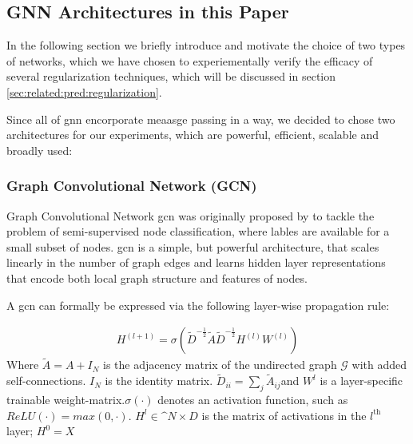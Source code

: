 \subsection{GNN Architectures in this Paper}
\label{sec:related:architectures}


In the following section we briefly introduce and
motivate the choice of two types of networks, which we have
chosen to experiementally verify the efficacy of several regularization techniques, which will be
discussed in section \cref{sec:related:pred:regularization}.

Since all of \ac{gnn} encorporate meaasge passing in a way, we decided to chose two architectures for our experiments, which are powerful, efficient, scalable and broadly used:
\subsubsection{Graph Convolutional Network (GCN)}
\label{sec:related:architectures:gcn}
Graph Convolutional Network \ac{gcn} was originally proposed by \citet{Kipf2017} to tackle the problem of semi-supervised node classification, where lables are available for a small subset of nodes. \ac{gcn} is a simple, but powerful architecture, that scales linearly in the number of graph
edges and learns hidden layer representations that encode both local graph structure and features of nodes.

A \acf{gcn} can formally be expressed via the following layer-wise propagation rule:

\begin{align*}
    H^{(l+1)} = \sigma (\tilde{D}^{-\frac{1}{2}}\tilde{A}\tilde{D}^{-\frac{1}{2}} H^{(l)}W^{(l)})
\end{align*}
Where $\tilde{A} = A + I_{N}$ is the adjacency matrix of the undirected graph $\mathcal{G}$
with added self-connections. $I_{N}$ is the identity matrix. $\tilde{D}_{ii} = \sum_{j}\tilde{A}_{ij}$and
$W^{l}$ is a layer-specific trainable weight-matrix.$\sigma(\cdot)$ denotes an activation function, such
as $ReLU(\cdot) = max(0, \cdot)$. $ H^{l}\in  \mathbb^{N \times D}$ is the matrix of activations in the
$l^{\mathrm{th}}$ layer; $H^{0}= X$

